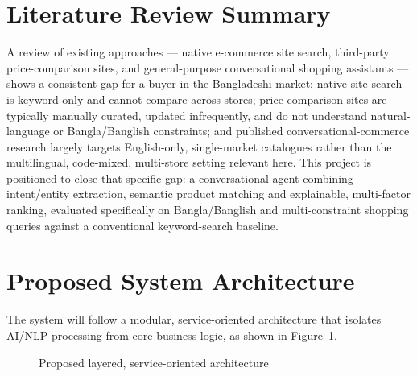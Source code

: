 \documentclass[12pt,a4paper]{article}
\begin{document}
\section{Literature Review Summary}

A review of existing approaches --- native e-commerce site search, third-party price-comparison sites, and
general-purpose conversational shopping assistants --- shows a consistent gap for a buyer in the Bangladeshi
market: native site search is keyword-only and cannot compare across stores; price-comparison sites are typically
manually curated, updated infrequently, and do not understand natural-language or Bangla/Banglish constraints; and
published conversational-commerce research largely targets English-only, single-market catalogues rather than the
multilingual, code-mixed, multi-store setting relevant here. This project is positioned to close that specific
gap: a conversational agent combining intent/entity extraction, semantic product matching and explainable,
multi-factor ranking, evaluated specifically on Bangla/Banglish and multi-constraint shopping queries against a
conventional keyword-search baseline.

\section{Proposed System Architecture}

The system will follow a modular, service-oriented architecture that isolates AI/NLP processing from core business
logic, as shown in Figure~\ref{fig:arch}.

\begin{figure}[H]
\centering
{}
\caption{Proposed layered, service-oriented architecture}
\label{fig:arch}
\end{figure}
\end{document}
